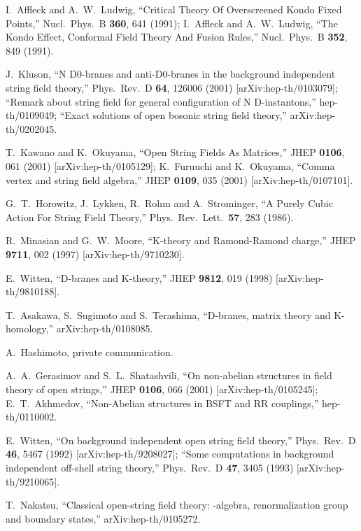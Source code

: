 \documentclass[a4paper,12pt]{article}
\begin{document}
\begin{thebibliography}{999}
I.~Affleck and A.~W.~Ludwig,
``Critical Theory Of Overscreened Kondo Fixed Points,''
Nucl.\ Phys.\ B {\bf 360}, 641 (1991);
I.~Affleck and A.~W.~Ludwig,
``The Kondo Effect, Conformal Field Theory And Fusion Rules,''
Nucl.\ Phys.\ B {\bf 352}, 849 (1991).






J.~Kluson,
``N D0-branes and anti-D0-branes in the 
background independent string  field theory,''
Phys.\ Rev.\ D {\bf 64}, 126006 (2001)
[arXiv:hep-th/0103079];
``Remark about string field for 
general configuration of N D-instantons,''
hep-th/0109049;
``Exact solutions of open bosonic string field theory,''
arXiv:hep-th/0202045.



T.~Kawano and K.~Okuyama,
``Open String Fields As Matrices,''
JHEP {\bf 0106}, 061 (2001) [arXiv:hep-th/0105129];
K.~Furuuchi and K.~Okuyama,
``Comma vertex and string field algebra,''
JHEP {\bf 0109}, 035 (2001) [arXiv:hep-th/0107101].

G.~T.~Horowitz, J.~Lykken, R.~Rohm and A.~Strominger,
``A Purely Cubic Action For String Field Theory,''
Phys.\ Rev.\ Lett.\  {\bf 57}, 283 (1986).


R.~Minasian and G.~W.~Moore,
``K-theory and Ramond-Ramond charge,''
JHEP {\bf 9711}, 002 (1997)
[arXiv:hep-th/9710230].

E.~Witten,
``D-branes and K-theory,''
JHEP {\bf 9812}, 019 (1998)
[arXiv:hep-th/9810188].

T.~Asakawa, S.~Sugimoto and S.~Terashima,
``D-branes, matrix theory and K-homology,''
arXiv:hep-th/0108085.

A.~Hashimoto, private communication.


A.~A.~Gerasimov and S.~L.~Shatashvili,
``On non-abelian structures in field theory of open strings,''
JHEP {\bf 0106}, 066 (2001)
[arXiv:hep-th/0105245];
E.~T.~Akhmedov,
``Non-Abelian structures in BSFT and RR couplings,''
hep-th/0110002.

E.~Witten,
``On background independent 
open string field theory,''
Phys.\ Rev.\ D {\bf 46}, 5467 (1992)
[arXiv:hep-th/9208027];
``Some computations in background 
independent off-shell string theory,''
Phys.\ Rev.\ D {\bf 47}, 3405 (1993)
[arXiv:hep-th/9210065].

T.~Nakatsu,
``Classical open-string field theory: \coordHE{}-algebra,  
renormalization group and boundary states,''
arXiv:hep-th/0105272.


\end{thebibliography}
\end{document}
